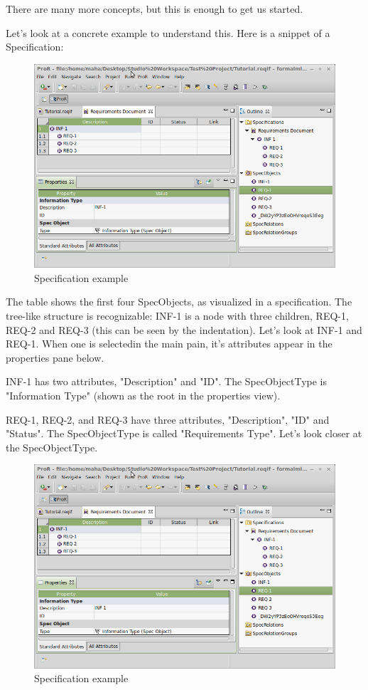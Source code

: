 There are many more concepts, but this is enough to get us started.

Let's look at a concrete example to understand this.  Here is a snippet of a Specification:

\begin{figure}[H]
  \centering
  \includegraphics[width=\textwidth]{../rmf-images/screenshot_INF_1.png}
  \caption{Specification example}
  \label{fig:spec_example}
\end{figure}

The table shows the first four SpecObjects, as visualized in a specification.  The tree-like structure is recognizable: INF-1 is a node
with three children, REQ-1, REQ-2 and REQ-3 (this can be seen by the indentation).  Let's look at INF-1 and REQ-1.  When one is selectedin the main pain, it's attributes appear in the properties pane below.

INF-1 has two attributes, "Description" and "ID".  The SpecObjectType is "Information Type" (shown as the root in the properties view).

REQ-1, REQ-2, and REQ-3 have three attributes, "Description", "ID" and "Status".  The SpecObjectType is called "Requirements Type".  Let's look closer at the SpecObjectType.

\begin{figure}[H]
  \centering
  \includegraphics[width=\textwidth]{../rmf-images/screenshot_INF_1.png}
  \caption{Specification example}
  \label{fig:spec_example}
\end{figure}

